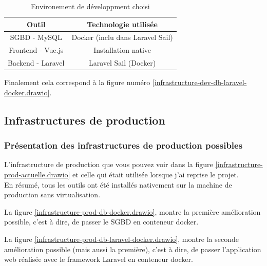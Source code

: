 \documentclass[
    iai, %
    il, %
]{heig-tb}
\begin{document}
\begin{table}[h]
    \begin{center}
        \caption{Environement de développment choisi \label{env-dev}}
        \begin{tabular}{c|c}
            Outil             & Technologie utilisée             \\ \hline
            SGBD - MySQL      & Docker (inclu dans Laravel Sail) \\
            Frontend - Vue.js & Installation native              \\
            Backend - Laravel & Laravel Sail (Docker)            \\
        \end{tabular}
    \end{center}
\end{table}

Finalement cela correspond à la figure numéro \ref{infrastructure-dev-db-laravel-docker.drawio}.

\clearpage
\subsection{Infrastructures de production}

\subsubsection{Présentation des infrastructures de production possibles}
L'infrastructure de production que vous pouvez voir dans la figure \ref{infrastructure-prod-actuelle.drawio} et celle qui était utilisée lorsque j'ai reprise le projet.\\
En résumé, tous les outils ont été installés nativement sur la machine de production sans virtualisation.\\

La figure \ref{infrastructure-prod-db-docker.drawio}, montre la première amélioration possible, c'est à dire, de passer le SGBD en conteneur docker.

La figure \ref{infrastructure-prod-db-laravel-docker.drawio}, montre la seconde amélioration possible (mais aussi la première), c'est à dire, de passer l'application web réalisée avec le framework Laravel en conteneur docker.
\end{document}

